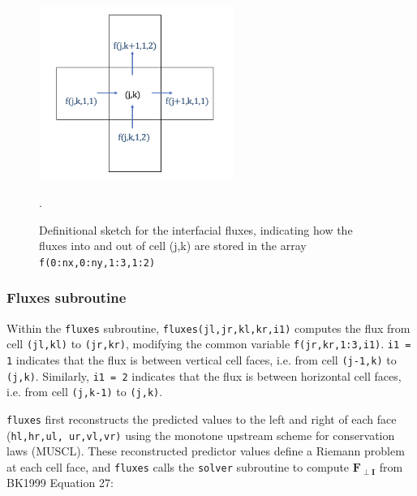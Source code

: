 \documentclass{article}
\newcommand{\code}[1]{\texttt{#1}}
\begin{document}
 \begin{figure}[h]
 \centering
\includegraphics[width=15pc]{grid/fluxes_specific.png}
 \caption{Definitional sketch for the interfacial fluxes, indicating how the fluxes into and out of cell (j,k) are stored in the array \code{f(0:nx,0:ny,1:3,1:2)}}.
 \label{fluxes_specific_A}
 \end{figure}

\subsubsection*{Fluxes subroutine}

Within the \code{fluxes} subroutine, \code{fluxes(jl,jr,kl,kr,i1)} computes the flux from cell \code{(jl,kl)} to \code{(jr,kr)}, modifying the common variable \code{f(jr,kr,1:3,i1)}. 
\code{i1 = 1} indicates that the flux is between vertical cell faces, i.e. from cell \code{(j-1,k)} to \code{(j,k)}.
Similarly, \code{i1 = 2} indicates that the flux is between horizontal cell faces, i.e. from cell \code{(j,k-1)} to \code{(j,k)}.

 
\code{fluxes}  first reconstructs the predicted values to the left and right of each face (\code{hl,hr,ul, ur,vl,vr)} using the monotone upstream scheme for conservation laws (MUSCL).  These reconstructed predictor values define a Riemann problem at each cell face, and \code{fluxes} calls the \code{solver} subroutine to compute $\mathbf{F_{\perp I}}$ from BK1999 Equation 27:
\end{document}
